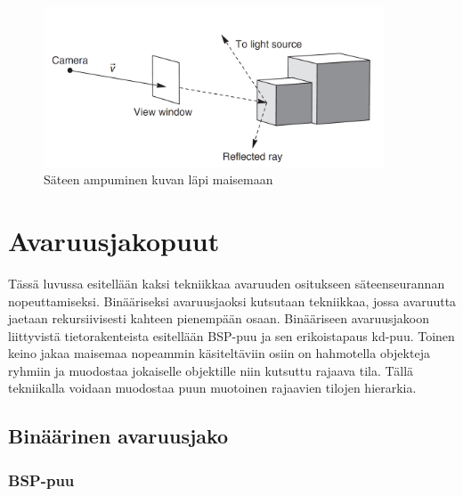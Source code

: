 ﻿\documentclass[a4paper, 12pt, titlepage]{article}
\begin{document}
\begin{figure}
 \centering 
 \includegraphics[width=0.9\textwidth]{img/raytracing.png}
 \vspace{0.4cm}
 \caption{Säteen ampuminen kuvan läpi maisemaan \citep{janke}}
 \label{raytracing}
 \vspace{-0.5cm}
\end{figure}


\vspace{-0.5cm}

\newpage
\section{Avaruusjakopuut}

Tässä luvussa esitellään kaksi tekniikkaa avaruuden ositukseen säteenseurannan nopeuttamiseksi. Binääriseksi avaruusjaoksi kutsutaan tekniikkaa, jossa avaruutta jaetaan rekursiivisesti kahteen pienempään osaan. Binääriseen avaruusjakoon liittyvistä tietorakenteista esitellään BSP-puu ja sen erikoistapaus kd-puu. Toinen keino jakaa maisemaa nopeammin käsiteltäviin osiin on hahmotella objekteja ryhmiin ja muodostaa jokaiselle objektille niin kutsuttu rajaava tila. Tällä tekniikalla voidaan muodostaa puun muotoinen rajaavien tilojen hierarkia. 

\subsection{Binäärinen avaruusjako}
\subsubsection{BSP-puu}
\end{document}
